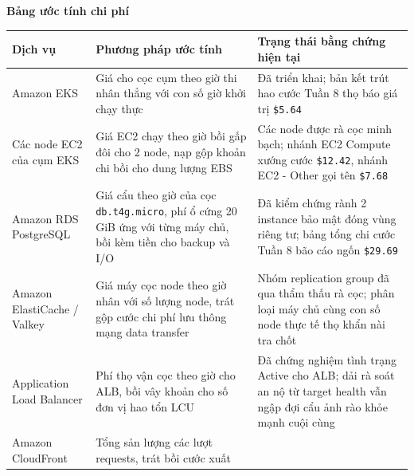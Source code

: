\vspace{0.5em}\noindent\textbf{Bảng ước tính chi
phí}\par

{
\begingroup
\small
\setlength{\tabcolsep}{3pt}
\renewcommand{\arraystretch}{1.15}
\begin{longtable}{@{}
  >{\raggedright\arraybackslash}p{}
  >{\raggedright\arraybackslash}p{}
  >{\raggedright\arraybackslash}p{}@{}}
\toprule\noalign{}
\begin{minipage}[b]{\linewidth}\raggedright
Dịch vụ
\end{minipage} & \begin{minipage}[b]{\linewidth}\raggedright
Phương pháp ước tính
\end{minipage} & \begin{minipage}[b]{\linewidth}\raggedright
Trạng thái bằng chứng hiện tại
\end{minipage} \\
\midrule\noalign{}
\endhead
\bottomrule\noalign{}
\endlastfoot
Amazon EKS & Giá cho cọc cụm theo giờ thi nhân thẳng với con số giờ khởi
chạy thực & Đã triển khai; bản kết trút hao cước Tuần 8 thọ báo giá trị
\texttt{\$5.\allowbreak{}64} \\
Các node EC2 của cụm EKS & Giá EC2 chạy theo giờ bồi gấp đôi cho 2 node,
nạp gộp khoản chi bồi cho dung lượng EBS & Các node được rà cọc minh
bạch; nhánh EC2 Compute xướng cước \texttt{\$12.\allowbreak{}42}, nhánh EC2 - Other
gọi tên \texttt{\$7.\allowbreak{}68} \\
Amazon RDS PostgreSQL & Giá cẩu theo giờ của cọc \texttt{db.\allowbreak{}t4g.\allowbreak{}micro},
phí ổ cứng 20 GiB ứng với từng máy chủ, bồi kèm tiền cho backup và I/O &
Đã kiểm chứng rành 2 instance bảo mật đóng vùng riêng tư; bảng tổng chi
cước Tuần 8 bão cáo ngốn \texttt{\$29.\allowbreak{}69} \\
Amazon ElastiCache / Valkey & Giá máy cọc node theo giờ nhân với số
lượng node, trát gộp cước chi phí lưu thông mạng data transfer & Nhóm
replication group đã qua thẩm thấu rà cọc; phân loại máy chủ cùng con số
node thực tế thọ khẩn nài tra chốt \\
Application Load Balancer & Phí thọ vận cọc theo giờ cho ALB, bồi vây
khoản cho số đơn vị hao tổn LCU & Đã chứng nghiệm tình trạng Active cho
ALB; dải rà soát an nộ từ target health vẫn ngập đợi cẩu ảnh rào khỏe
mạnh cuội cùng \\
Amazon CloudFront & Tổng sản lượng các lượt requests, trát bồi cước xuất

\end{longtable}}
